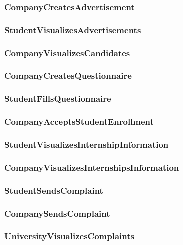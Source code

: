 \subsubsection{CompanyCreatesAdvertisement}

\subsubsection{StudentVisualizesAdvertisements}

\subsubsection{CompanyVisualizesCandidates}

\subsubsection{CompanyCreatesQuestionnaire}

\subsubsection{StudentFillsQuestionnaire}

\subsubsection{CompanyAcceptsStudentEnrollment}

\subsubsection{StudentVisualizesInternshipInformation}

\subsubsection{CompanyVisualizesInternshipsInformation}

\subsubsection{StudentSendsComplaint}

\subsubsection{CompanySendsComplaint}

\subsubsection{UniversityVisualizesComplaints}

